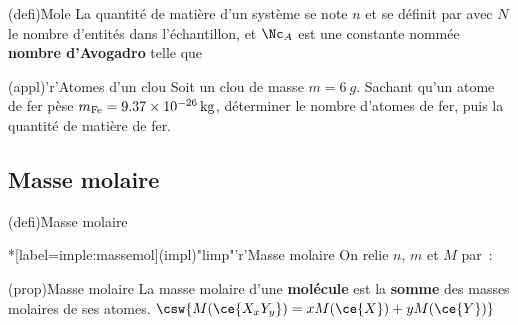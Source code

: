 \documentclass[../../main/main.tex]{subfiles}
\begin{document}
\begin{tcbraster}[raster columns=2, raster equal height=rows]
	\begin{tcb}[label=def:mole](defi){Mole}
		La quantité de matière d'un système se note $n$ et se définit par
		\csw{
			\[
				\boxed{n = \frac{N}{\Nc_A}}
				\quad \text{en \textbf{moles}, \si{mol}}
			\]
		}
		avec $N$ le nombre d'entités dans l'échantillon, et $\Nc_A$ est une
		constante nommée \textbf{nombre d'Avogadro} telle que
		\csw{
			\[
				\Nc_A = \SI{6.02214076e23}{mol^{-1}}
			\]
		}
	\end{tcb}
	\begin{tcb}[label=exem:nbat](appl)'r'{Atomes d'un clou}
		Soit un clou de masse $m = \SI{6}{g}$. Sachant qu'un atome de fer pèse
		$m_{\rm Fe} = \SI{9.37e-26}{kg}$, déterminer le nombre d'atomes de fer, puis
		la quantité de matière de fer.
		\tcblower
	\end{tcb}
\end{tcbraster}

\subsection{Masse molaire}

\begin{tcbraster}[raster columns=2, raster equal height=rows]
	\begin{tcb}[label=massemol](defi){Masse molaire}
	\end{tcb}
	\begin{tcb}*[label=imple:massemol](impl)"limp"'r'{Masse molaire}
		On relie $n$, $m$ et $M$ par~:
		\csw{
			\[\boxed{n = \frac{m}{M}}\]
		}
	\end{tcb}
\end{tcbraster}
(prop){Masse molaire}{
	La masse molaire d'une \textbf{molécule} est la \textbf{somme} des masses
	molaires de ses atomes.
}
{
	$\csw{M(\ce{X_xY_y}) = xM(\ce{X}) + yM(\ce{Y})}$
}
\end{document}
